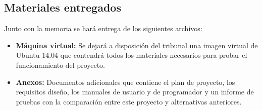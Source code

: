 \subsection{Materiales entregados}
Junto con la memoria se hará entrega de los siguientes archivos:
	\begin{itemize}
	\item \textbf{Máquina virtual:} Se dejará a disposición del tribunal una imagen virtual de Ubuntu 14.04 que contendrá todos los materiales necesarios para probar el funcionamiento del proyecto.
	\item \textbf{Anexos:} Documentos adicionales que contiene el plan de proyecto, los requisitos diseño, los manuales de usuario y de programador y un informe de pruebas con la comparación entre este proyecto y alternativas anteriores.
	\end{itemize}
